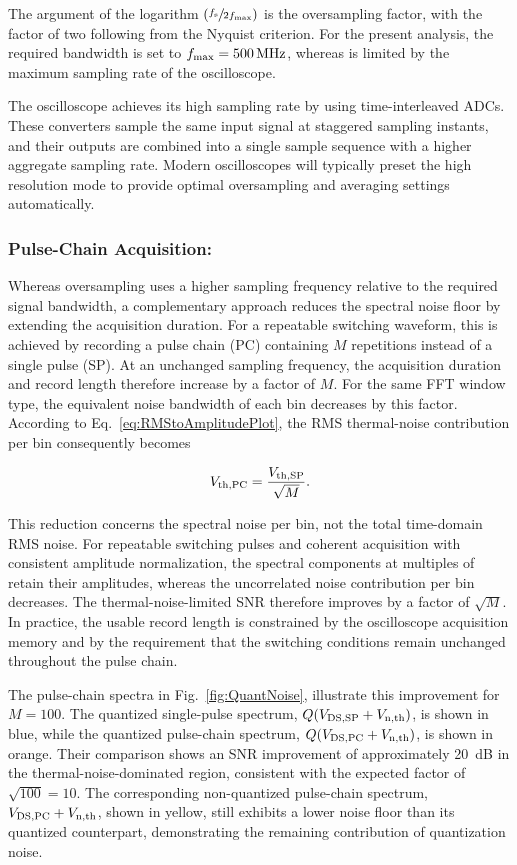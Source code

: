 The argument of the logarithm $(\sfrac{{f}_{\mathrm{s}}}{2{f}_{\mathrm{max}}})$ is the oversampling factor, with the factor of two following from the Nyquist criterion.
For the present analysis, the required bandwidth is set to ${f}_{\mathrm{max}} = \SI{500}{MHz}$, whereas  is limited by the maximum sampling rate of the oscilloscope.

The oscilloscope achieves its high sampling rate by using time-interleaved ADCs.
These converters sample the same input signal at staggered sampling instants, and their outputs are combined into a single sample sequence with a higher aggregate sampling rate.
Modern oscilloscopes will typically preset the high resolution mode to provide optimal oversampling and averaging settings automatically.

\subsubsection*{Pulse-Chain Acquisition:}
Whereas oversampling uses a higher sampling frequency relative to the required signal bandwidth, a complementary approach reduces the spectral noise floor by extending the acquisition duration.
For a repeatable switching waveform, this is achieved by recording a pulse chain (PC) containing $M$ repetitions instead of a single pulse (SP).
At an unchanged sampling frequency, the acquisition duration and record length therefore increase by a factor of $M$.
For the same FFT window type, the equivalent noise bandwidth of each bin decreases by this factor.
According to Eq.~\ref{eq:RMStoAmplitudePlot}, the RMS thermal-noise contribution per bin consequently becomes

\begin{equation}
	{V}_{\mathrm{th,PC}} = \frac{{V}_{\mathrm{th,SP}}}{\sqrt{M}}.
\end{equation}

This reduction concerns the spectral noise per bin, not the total time-domain RMS noise.
For repeatable switching pulses and coherent acquisition with consistent amplitude normalization, the spectral components at multiples of  retain their amplitudes, whereas the uncorrelated noise contribution per bin decreases.
The thermal-noise-limited SNR therefore improves by a factor of $\sqrt{M}$.
In practice, the usable record length is constrained by the oscilloscope acquisition memory and by the requirement that the switching conditions remain unchanged throughout the pulse chain.

The pulse-chain spectra in Fig.~\ref{fig:QuantNoise}, illustrate this improvement for $M=100$.
The quantized single-pulse spectrum, $Q({V}_{\mathrm{DS,SP}}+{V}_{\mathrm{n,th}})$, is shown in blue, while the quantized pulse-chain spectrum, $Q({V}_{\mathrm{DS,PC}}+{V}_{\mathrm{n,th}})$, is shown in orange.
Their comparison shows an SNR improvement of approximately \SI{20}{dB} in the thermal-noise-dominated region, consistent with the expected factor of $\sqrt{100}=10$.
The corresponding non-quantized pulse-chain spectrum, ${V}_{\mathrm{DS,PC}}+{V}_{\mathrm{n,th}}$, shown in yellow, still exhibits a lower noise floor than its quantized counterpart, demonstrating the remaining contribution of quantization noise.

